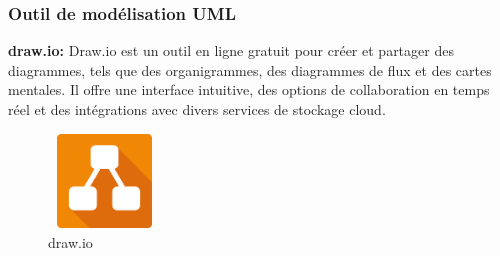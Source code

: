 \documentclass[edit,12pt,a4paper,ChapStyle,oneside,doubleinterligne]{report}
\begin{document}
\subsubsection{ Outil de modélisation UML }
\textbf{draw.io: }Draw.io est un outil en ligne gratuit pour créer et partager des diagrammes, tels que des organigrammes, des diagrammes de flux et des cartes mentales. Il offre une interface intuitive, des options de collaboration en temps réel et des intégrations avec divers services de stockage cloud\cite{drawio}.
\begin{figure}[H]\label{fig:draw.io}
    \centering
    \includegraphics[width=3cm , height = 2.5cm , angle=360]{images/drawio.png}
    \caption{draw.io}
    \end{figure}
\end{document}
